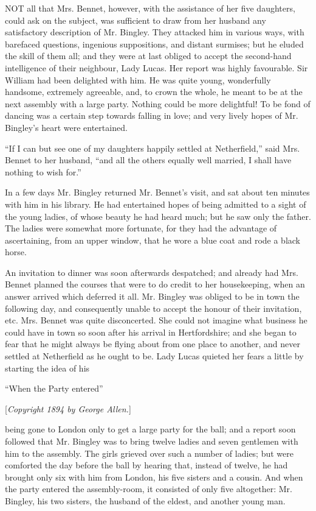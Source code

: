 \documentclass[12pt,openright]{book}
\begin{document}
\noindent  NOT all that Mrs. Bennet, however, with the assistance of her five daughters, could ask on the subject, was sufficient to draw from her husband any satisfactory description of Mr. Bingley. They attacked him in various ways, with barefaced questions, ingenious suppositions, and distant surmises; but he eluded the skill of them all; and they were at last obliged to accept the second-hand intelligence of their neighbour, Lady Lucas. Her report was highly favourable. Sir William had been delighted with him. He was quite young, wonderfully handsome, extremely agreeable, and, to crown the whole, he meant to be at the next assembly with a large party. Nothing could be more delightful! To be fond of dancing was a certain step towards falling in love; and very lively hopes of Mr. Bingley’s heart were entertained.

“If I can but see one of my daughters happily settled at Netherfield,” said Mrs. Bennet to her husband, “and all the others equally well married, I shall have nothing to wish for.”

In a few days Mr. Bingley returned Mr. Bennet’s visit, and sat about ten minutes with him in his library. He had entertained hopes of being admitted to a sight of the young ladies, of whose beauty he had heard much; but he saw only the father. The ladies were somewhat more fortunate, for they had the advantage of ascertaining, from an upper window, that he wore a blue coat and rode a black horse.

An invitation to dinner was soon afterwards despatched; and already had Mrs. Bennet planned the courses that were to do credit to her housekeeping, when an answer arrived which deferred it all. Mr. Bingley was obliged to be in town the following day, and consequently unable to accept the honour of their invitation, etc. Mrs. Bennet was quite disconcerted. She could not imagine what business he could have in town so soon after his arrival in Hertfordshire; and she began to fear that he might always be flying about from one place to another, and never settled at Netherfield as he ought to be. Lady Lucas quieted her fears a little by starting the idea of his

“When the Party entered”

[\textit{Copyright 1894 by George Allen.}]

being gone to London only to get a large party for the ball; and a report soon followed that Mr. Bingley was to bring twelve ladies and seven gentlemen with him to the assembly. The girls grieved over such a number of ladies; but were comforted the day before the ball by hearing that, instead of twelve, he had brought only six with him from London, his five sisters and a cousin. And when the party entered the assembly-room, it consisted of only five altogether: Mr. Bingley, his two sisters, the husband of the eldest, and another young man.
\end{document}
